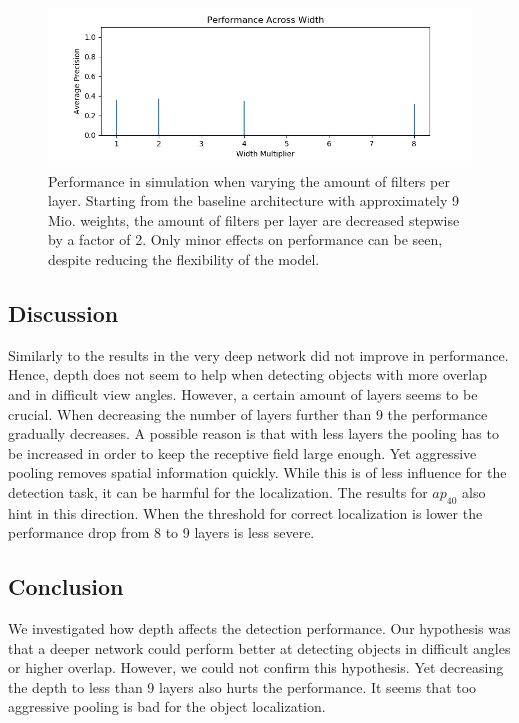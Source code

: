 \begin{figure}[hbtp]
	\centering
	\includegraphics[width=\textwidth]{fig/perf_width}
	\caption{Performance in simulation when varying the amount of filters per layer. Starting from the baseline architecture with approximately 9 Mio. weights, the amount of filters per layer are decreased stepwise by a factor of 2. Only minor effects on performance can be seen, despite reducing the flexibility of the model.}
	\label{fig:perf_width}
\end{figure}



\subsection{Discussion}

Similarly to the results in  the very deep network did not improve in performance. Hence, depth does not seem to help when detecting objects with more overlap and in difficult view angles. However, a certain amount of layers seems to be crucial. When decreasing the number of layers further than 9 the performance gradually decreases. A possible reason is that with less layers the pooling has to be increased in order to keep the receptive field large enough. Yet aggressive pooling removes spatial information quickly. While this is of less influence for the detection task, it can be harmful for the localization. The results for $ap_{40}$ also hint in this direction. When the threshold for correct localization is lower the performance drop from 8 to 9 layers is less severe.


\subsection{Conclusion}

We investigated how depth affects the detection performance. Our hypothesis was that a deeper network could perform better at detecting objects in difficult angles or higher overlap. However, we could not confirm this hypothesis. Yet decreasing the depth to less than 9 layers also hurts the performance. It seems that too aggressive pooling is bad for the object localization.

